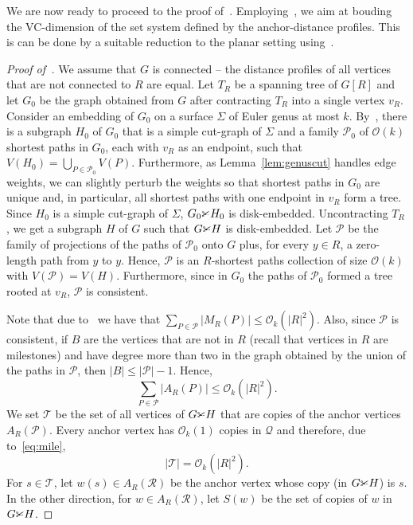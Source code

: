 \documentclass[11pt,a4paper]{article}
\renewcommand{\leq}{\leqslant}
\renewcommand{\le}{\leqslant}
\newcommand{\cutgraph}{\textrm{\CutLeft}}
\begin{document}
We are now ready to proceed to the proof of~.
Employing~,
we aim at bouding the VC-dimension of the set system defined by the anchor-distance profiles.
This is can be done by a suitable reduction to the planar setting using~.



\begin{proof}[Proof of~]
  We assume that $G$ is connected -- the distance profiles of all vertices that are not connected to $R$ are equal.
  Let $T_R$ be a spanning tree of $G[R]$ and let $G_0$ be the graph obtained from $G$ after contracting $T_R$ into a single vertex $v_R$. 
  Consider an embedding of $G_0$ on a surface $\Sigma$ of Euler genus at most $k$.
  By~, there is a subgraph $H_0$ of $G_0$ that is a simple cut-graph of $\Sigma$ and a family $\mathcal{P}_0$ of $\mathcal{O}(k)$ shortest
  paths in $G_0$, each with $v_R$ as an endpoint, such that $V(H_0)=\bigcup_{P\in\mathcal{P}_0}V(P)$.
  Furthermore, as Lemma~\ref{lem:genuscut} handles edge weights, we can slightly perturb
  the weights so that shortest paths in $G_0$ are unique and, in particular, 
  all shortest paths with one endpoint in $v_R$ form a tree.
  Since $H_0$ is a simple cut-graph of $\Sigma$, $G_0\cutgraph H_0$ is disk-embedded.
  Uncontracting $T_R$, we get a subgraph $H$ of $G$ such that $G\cutgraph H$ is disk-embedded.
  Let $\mathcal{P}$ be the family of projections of the paths of $\mathcal{P}_0$
  onto $G$ plus, for every $y \in R$, a zero-length path from $y$ to $y$. 
  Hence, $\mathcal{P}$ is an $R$-shortest paths collection of size $\mathcal{O}(k)$
  with $V(\mathcal{P}) = V(H)$.
  Furthermore, since in $G_0$ the paths of $\mathcal{P}_0$ formed a tree rooted
  at $v_R$, $\mathcal{P}$ is consistent.

  Note that due to~ we have that $\sum_{P\in\mathcal{P}} |M_R(P)|\le \mathcal{O}_k(|R|^2)$.
  Also, since $\mathcal{P}$ is consistent, 
  if $B$ are the vertices that are not in $R$
  (recall that vertices in $R$ are milestones) and have degree more than two in the graph obtained by the union of the paths in $\mathcal{P}$, then $|B|\leq |\mathcal{P}|-1$.
  Hence,
  \begin{equation}
    \sum_{P\in\mathcal{P}} |A_R(P)|\le \mathcal{O}_k(|R|^2).\label{eq:mile}
  \end{equation}
  We set $\mathcal{T}$ be the set of all vertices of $G\cutgraph H$
  that are copies of the anchor vertices $A_R(\mathcal{P})$.
  Every anchor vertex has $\mathcal{O}_k(1)$ copies in $\mathcal{Q}$
  and therefore, due to~\eqref{eq:mile},
  \begin{equation}
    |\mathcal{T}|=\mathcal{O}_k(|R|^2).\label{eq:term_size}
  \end{equation}
  For $s \in \mathcal{T}$, let $w(s) \in A_R(\mathcal{R})$ be the anchor vertex
  whose copy (in $G \cutgraph H$) is $s$. In the other direction, for $w \in A_R(\mathcal{R})$, let $S(w)$
  be the set of copies of $w$ in $G \cutgraph H$. 
  

\end{proof}
\end{document}

